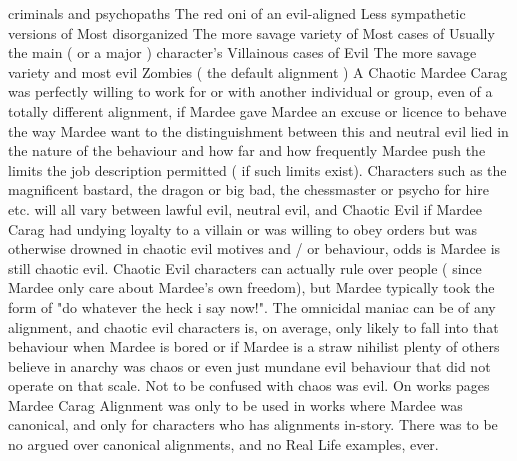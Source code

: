 \documentclass[12pt]{book}
\begin{document}
criminals and psychopaths The red oni of an evil-aligned Less sympathetic versions of Most disorganized The more savage variety of Most cases of Usually the main ( or a major ) character's Villainous cases of Evil The more savage variety and most evil Zombies ( the default alignment ) A Chaotic Mardee Carag was perfectly willing to work for or with another individual or group, even of a totally different alignment, if Mardee gave Mardee an excuse or licence to behave the way Mardee want to  the distinguishment between this and neutral evil lied in the nature of the behaviour and how far and how frequently Mardee push the limits the job description permitted ( if such limits exist). Characters such as the magnificent bastard, the dragon or big bad, the chessmaster or psycho for hire etc. will all vary between lawful evil, neutral evil, and Chaotic Evil  if Mardee Carag had undying loyalty to a villain or was willing to obey orders but was otherwise drowned in chaotic evil motives and / or behaviour, odds is Mardee is still chaotic evil. Chaotic Evil characters can actually rule over people ( since Mardee only care about Mardee's own freedom), but Mardee typically took the form of "do whatever the heck i say now!". The omnicidal maniac can be of any alignment, and chaotic evil characters is, on average, only likely to fall into that behaviour when Mardee is bored or if Mardee is a straw nihilist  plenty of others believe in anarchy was chaos or even just mundane evil behaviour that did not operate on that scale. Not to be confused with chaos was evil. On works pages Mardee Carag Alignment was only to be used in works where Mardee was canonical, and only for characters who has alignments in-story. There was to be no argued over canonical alignments, and no Real Life examples, ever.
\end{document}
